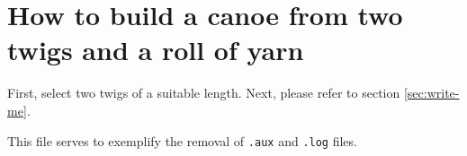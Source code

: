 \section{How to build a canoe from two twigs and a roll of yarn}
\label{sec:build-canoe}

First, select two twigs of a suitable length. Next, please refer to section \ref{sec:write-me}.

This file serves to exemplify the removal of \texttt{.aux} and \texttt{.log} files.
